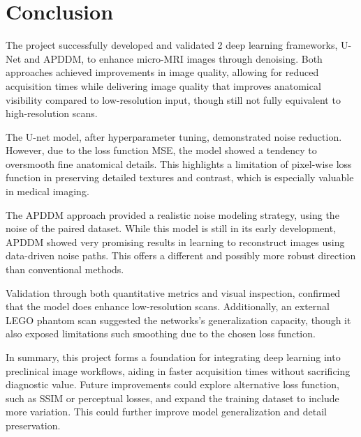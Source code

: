 \documentclass[twocolumn]{article}
\begin{document}
\section{Conclusion}


The project successfully developed and validated 2 deep learning frameworks, U-Net and APDDM, to enhance micro-MRI images through denoising. 
Both approaches achieved improvements in image quality, allowing for reduced acquisition times while delivering image quality that improves anatomical visibility compared to low-resolution input, though still not fully equivalent to high-resolution scans. 

The U-net model, after hyperparameter tuning, demonstrated noise reduction. 
However, due to the loss function MSE, the model showed a tendency to oversmooth fine anatomical details. 
This highlights a limitation of pixel-wise loss function in preserving detailed textures and contrast, which is especially valuable in medical imaging.

The APDDM approach provided a realistic noise modeling strategy, using the noise of the paired dataset. 
While this model is still in its early development, APDDM showed very promising results in learning to reconstruct images using data-driven noise paths. 
This offers a different and possibly more robust direction than conventional methods. 

Validation through both quantitative metrics and visual inspection, confirmed that the model does enhance low-resolution scans. 
Additionally, an external LEGO phantom scan suggested the networks’s generalization capacity, though it also exposed limitations such smoothing due to the chosen loss function. 

In summary, this project forms a foundation for integrating deep learning into preclinical image workflows, aiding in faster acquisition times without sacrificing diagnostic value. 
Future improvements could explore alternative loss function, such as SSIM or perceptual losses, and expand the training dataset to include more variation. 
This could further improve model generalization and detail preservation.
\end{document}
